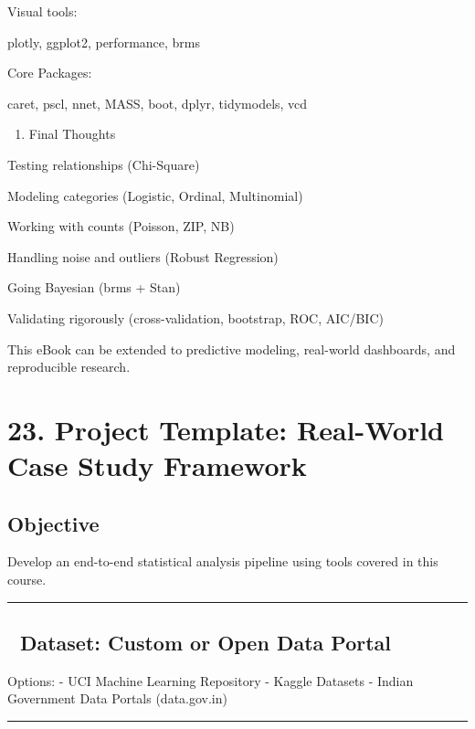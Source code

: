 \documentclass[
  letterpaper,
  DIV=11,
  numbers=noendperiod]{scrreprt}
\providecommand{\tightlist}{%
  \setlength{\itemsep}{0pt}\setlength{\parskip}{0pt}}
\begin{document}
{Visual tools:

plotly, ggplot2, performance, brms

Core Packages:

caret, pscl, nnet, MASS, boot, dplyr, tidymodels, vcd

\begin{enumerate}
\def\labelenumi{\arabic{enumi}.}
\setcounter{enumi}{21}
\tightlist
\item
  Final Thoughts
\end{enumerate}

Testing relationships (Chi-Square)

Modeling categories (Logistic, Ordinal, Multinomial)

Working with counts (Poisson, ZIP, NB)

Handling noise and outliers (Robust Regression)

Going Bayesian (brms + Stan)

Validating rigorously (cross-validation, bootstrap, ROC, AIC/BIC)

This eBook can be extended to predictive modeling, real-world
dashboards, and reproducible research.

\section{23. Project Template: Real-World Case Study
Framework}\label{project-template-real-world-case-study-framework}

\subsection{Objective}\label{objective}

Develop an end-to-end statistical analysis pipeline using tools covered
in this course.

\begin{center}\rule{0.5\linewidth}{0.5pt}\end{center}

\subsection{📁 Dataset: Custom or Open Data
Portal}\label{dataset-custom-or-open-data-portal}

Options: - UCI Machine Learning Repository - Kaggle Datasets - Indian
Government Data Portals (data.gov.in)

\begin{center}\rule{0.5\linewidth}{0.5pt}\end{center}

}
\end{document}
